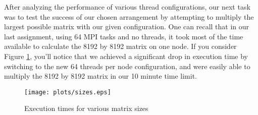 \documentclass[twocolumn]{article}
\begin{document}
After analyzing the performance of various thread configurations, our next task
was to test the success of our chosen arrangement by attempting to multiply the
largest possible matrix with our given configuration. One can recall that in our
last assignment, using 64 MPI tasks and no threads, it took most of the time 
available to calculate the 8192 by 8192 matrix on one node. If you consider Figure
\ref{fig:time}, you'll notice that we achieved a significant drop in execution 
time by switching to the new 64 threads per node configuration, and were easily 
able to multiply the 8192 by 8192 matrix in our 10 minute time limit.

\begin{figure}
  \texttt{[image: plots/sizes.eps]}
  \caption{Execution times for various matrix sizes} \label{fig:time}
\end{figure}
\end{document}
